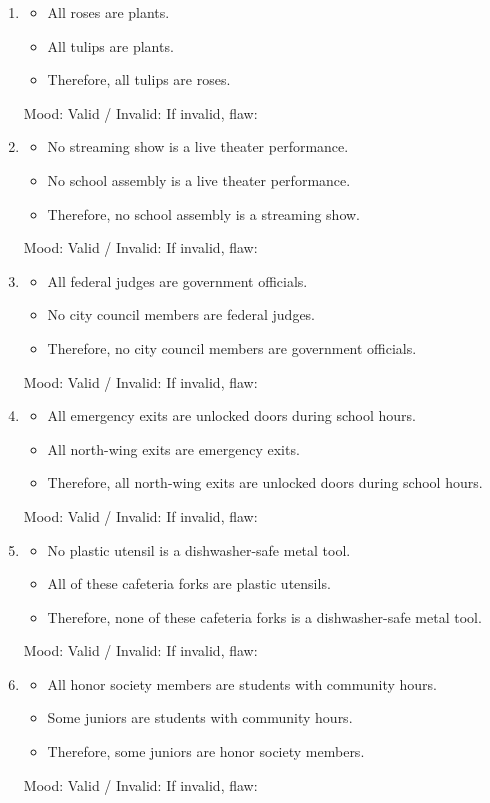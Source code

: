 \documentclass[11pt]{article}
\newcommand{\syllblock}[3]{%
\begin{itemize}[leftmargin=1.2em]
\item #1
\item #2
\item #3
\end{itemize}
}
\begin{document}
\begin{enumerate}[itemsep=0.45em, parsep=0.15em, topsep=0.3em]
\item
\syllblock
{All roses are plants.}
{All tulips are plants.}
{Therefore, all tulips are roses.}
Mood: \underline{\hspace{0.9in}}
Valid / Invalid: \underline{\hspace{1.0in}}
If invalid, flaw: \underline{\hspace{3.2in}}

\item
\syllblock
{No streaming show is a live theater performance.}
{No school assembly is a live theater performance.}
{Therefore, no school assembly is a streaming show.}
Mood: \underline{\hspace{0.9in}}
Valid / Invalid: \underline{\hspace{1.0in}}
If invalid, flaw: \underline{\hspace{3.2in}}

\item
\syllblock
{All federal judges are government officials.}
{No city council members are federal judges.}
{Therefore, no city council members are government officials.}
Mood: \underline{\hspace{0.9in}}
Valid / Invalid: \underline{\hspace{1.0in}}
If invalid, flaw: \underline{\hspace{3.2in}}

\item
\syllblock
{All emergency exits are unlocked doors during school hours.}
{All north-wing exits are emergency exits.}
{Therefore, all north-wing exits are unlocked doors during school hours.}
Mood: \underline{\hspace{0.9in}}
Valid / Invalid: \underline{\hspace{1.0in}}
If invalid, flaw: \underline{\hspace{3.2in}}

\item
\syllblock
{No plastic utensil is a dishwasher-safe metal tool.}
{All of these cafeteria forks are plastic utensils.}
{Therefore, none of these cafeteria forks is a dishwasher-safe metal tool.}
Mood: \underline{\hspace{0.9in}}
Valid / Invalid: \underline{\hspace{1.0in}}
If invalid, flaw: \underline{\hspace{3.2in}}

\item
\syllblock
{All honor society members are students with community hours.}
{Some juniors are students with community hours.}
{Therefore, some juniors are honor society members.}
Mood: \underline{\hspace{0.9in}}
Valid / Invalid: \underline{\hspace{1.0in}}
If invalid, flaw: \underline{\hspace{3.2in}}


\end{enumerate}
\end{document}
